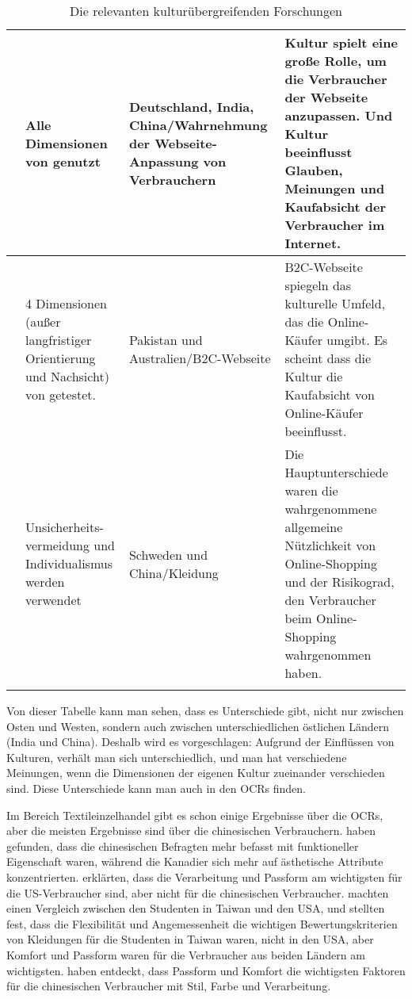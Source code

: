 \begin{table}[h]
\begin{longtable}{p{} p{} p{}  p{}}
  \citet{Singh2006} & Alle Dimensionen von \citeauthor{hofstede2001culture} genutzt& Deutschland, India, China/Wahrnehmung der Webseite-Anpassung von Verbrauchern& Kultur spielt eine große Rolle, um die Verbraucher der Webseite anzupassen. Und Kultur beeinflusst Glauben, Meinungen und Kaufabsicht der Verbraucher im Internet. \\ \hline
  \citet{Sohaib2014} & 4 Dimensionen (außer langfristiger Orientierung und Nachsicht) von \citeauthor{hofstede2001culture} getestet. &Pakistan und Australien/\acs{B2C}-Webseite & \acs{B2C}-Webseite spiegeln das kulturelle Umfeld, das die Online-Käufer umgibt. Es scheint dass die Kultur die Kaufabsicht von Online-Käufer beeinflusst. \\ \hline
  \citet{Stenberg2014} & Unsicherheits-vermeidung und Individualismus werden verwendet & Schweden und China/Kleidung & Die Hauptunterschiede waren die wahrgenommene allgemeine Nützlichkeit von Online-Shopping und der Risikograd, den Verbraucher beim Online-Shopping wahrgenommen haben. \\ \hline

\caption[Die relevanten kulturübergreifenden Forschungen]{Die relevanten kulturübergreifenden Forschungen}
\label{tab:relevanteForschungen}
\end{longtable}
\end{table}


Von dieser Tabelle kann man sehen, dass es Unterschiede gibt, nicht nur zwischen Osten und Westen, sondern auch zwischen unterschiedlichen östlichen Ländern (India und China). Deshalb wird es vorgeschlagen: Aufgrund der Einflüssen von Kulturen, verhält man sich unterschiedlich, und man hat verschiedene Meinungen, wenn die Dimensionen der eigenen Kultur zueinander verschieden sind. Diese Unterschiede kann man auch in den \ac{OCRs} finden.

Im Bereich Textileinzelhandel gibt es schon einige Ergebnisse über die \ac{OCRs}, aber die meisten Ergebnisse sind über die chinesischen Verbrauchern. \citet{rahman2010evaluative} haben gefunden, dass die chinesischen Befragten mehr befasst mit funktioneller Eigenschaft waren, während die Kanadier sich mehr auf ästhetische Attribute konzentrierten. \citet{Jin2010} erklärten, dass die Verarbeitung und Passform am wichtigsten für die US-Verbraucher sind, aber nicht für die chinesischen Verbraucher. \citet{hsu2002clothing} machten einen Vergleich zwischen den Studenten in Taiwan und den USA, und stellten fest, dass die Flexibilität und Angemessenheit die wichtigen Bewertungskriterien von Kleidungen für die Studenten in Taiwan waren, nicht in den USA, aber Komfort und Passform waren für die Verbraucher aus beiden Ländern am wichtigsten. \citet{zhang2002casual} haben entdeckt, dass Passform und Komfort die wichtigsten Faktoren für die chinesischen Verbraucher mit Stil, Farbe und Verarbeitung.


